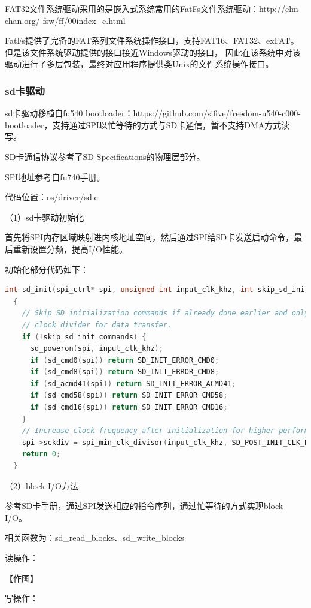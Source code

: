 \documentclass[UTF8,a4paper,10pt]{ctexart}
\begin{document}
FAT32文件系统驱动采用的是嵌入式系统常用的FatFs文件系统驱动：http://elm-chan.org/
fsw/ff/00index\_e.html

FatFs提供了完备的FAT系列文件系统操作接口，支持FAT16、FAT32、exFAT。
但是该文件系统驱动提供的接口接近Windows驱动的接口，
因此在该系统中对该驱动进行了多层包装，最终对应用程序提供类Unix的文件系统操作接口。

\subsubsection{sd卡驱动}

sd卡驱动移植自fu540 bootloader：https://github.com/sifive/freedom-u540-c000-bootloader，支持通过SPI以忙等待的方式与SD卡通信，暂不支持DMA方式读写。

SD卡通信协议参考了SD Specifications的物理层部分。

SPI地址参考自fu740手册。

代码位置：os/driver/sd.c

（1）sd卡驱动初始化

首先将SPI内存区域映射进内核地址空间，然后通过SPI给SD卡发送启动命令，最后重新设置分频，提高I/O性能。

初始化部分代码如下：

\begin{lstlisting}[title=sd卡驱动初始化,frame=trbl,language={C}]
  int sd_init(spi_ctrl* spi, unsigned int input_clk_khz, int skip_sd_init_commands)
  {
    // Skip SD initialization commands if already done earlier and only set the
    // clock divider for data transfer.
    if (!skip_sd_init_commands) {
      sd_poweron(spi, input_clk_khz);
      if (sd_cmd0(spi)) return SD_INIT_ERROR_CMD0;
      if (sd_cmd8(spi)) return SD_INIT_ERROR_CMD8;
      if (sd_acmd41(spi)) return SD_INIT_ERROR_ACMD41;
      if (sd_cmd58(spi)) return SD_INIT_ERROR_CMD58;
      if (sd_cmd16(spi)) return SD_INIT_ERROR_CMD16;
    }
    // Increase clock frequency after initialization for higher performance.
    spi->sckdiv = spi_min_clk_divisor(input_clk_khz, SD_POST_INIT_CLK_KHZ);
    return 0;
  }
  \end{lstlisting}

（2）block I/O方法

参考SD卡手册，通过SPI发送相应的指令序列，通过忙等待的方式实现block I/O。

相关函数为：sd\_read\_blocks、sd\_write\_blocks

读操作：

【作图】

写操作：
\end{document}
